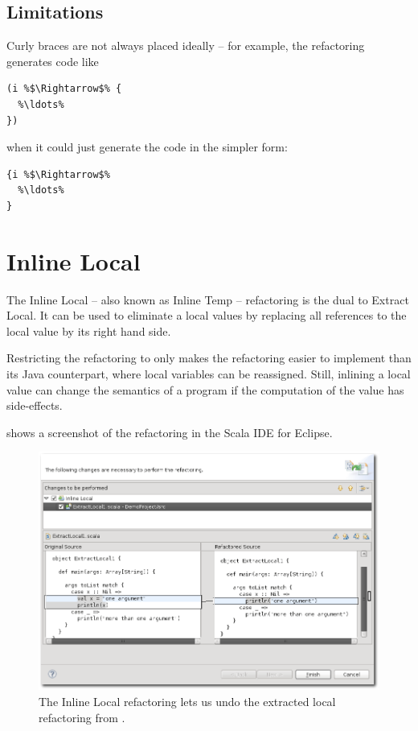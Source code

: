 \documentclass[10pt,a4paper,oneside]{scrreprt}
\begin{document}
\subsection{Limitations}

Curly braces are not always placed ideally -- for example, the refactoring generates code like 

\begin{lstlisting}
(i %$\Rightarrow$% {
  %\ldots%
})
\end{lstlisting}

when it could just generate the code in the simpler form:

\begin{lstlisting}
{i %$\Rightarrow$%
  %\ldots%
}
\end{lstlisting}

\section{Inline Local}

The Inline Local -- also known as Inline Temp -- refactoring is the dual to Extract Local. It can be used to eliminate a local values by replacing all references to the local value by its right hand side.

Restricting the refactoring to  only makes the refactoring easier to implement than its Java counterpart, where local variables can be reassigned. Still, inlining a local value can change the semantics of a program if the computation of the value has side-effects.

 shows a screenshot of the refactoring in the Scala IDE for Eclipse.

\begin{figure}
  \centering
  \includegraphics[width=\linewidth]{inline_local_screenshot_1.png}
  \caption{The Inline Local refactoring lets us undo the extracted local refactoring from .}
  \label{figure:inline-local-screenshot-1}
\end{figure}
\end{document}
